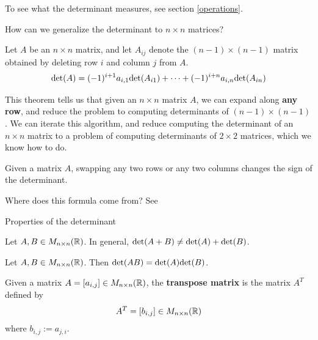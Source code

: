 To see what the determinant measures, see section \ref{operations}.


\begin{motivating}
How can we generalize the determinant to $n \times n$ matrices?
\end{motivating}

\begin{theorem}
    Let $A$ be an $n \times n$ matrix, and let $A_{ij}$ denote the $(n-1) \times (n-1)$ matrix obtained by deleting row $i$ and column $j$ from $A$.
    $$\textnormal{det}(A) = (-1)^{i+1}a_{i,1}\textnormal{det}(A_{i1}) + \cdots +  (-1)^{i+n}a_{i,n}\textnormal{det}(A_{in})$$
    
    \end{theorem}

This theorem tells us that given an $n \times n$ matrix $A$, we can expand along \textbf{any row}, and reduce the problem to computing determinants of $(n-1) \times (n-1)$.  We can iterate this algorithm, and reduce computing the determinant of an $n \times n$ matrix to a problem of computing determinants of $2 \times 2$ matrices, which we know how to do.

\begin{proposition}
    Given a matrix $A$, swapping any two rows or any two columns changes the sign of the determinant.
\end{proposition}




Where does this formula come from? See 




Properties of the determinant
    
    \begin{remark}
    Let $A, B \in M_{n \times n}(\mathbb{R})$. In general, $\textnormal{det}(A+B) \neq \textnormal{det}(A) + \textnormal{det}(B)$.
    \end{remark}
    
    \begin{theorem}

    Let $A, B \in M_{n \times n}(\mathbb{R})$.  Then $\textnormal{det}(AB) = \textnormal{det}(A)\textnormal{det}(B)$.
     
    \end{theorem}
    
    


\begin{definition}
    Given a matrix $A = [a_{i,j}] \in M_{n\times n}(\mathbb{R})$, the \textbf{transpose matrix} is the matrix $A^T$ defined by $$A^T = [b_{i,j}] \in M_{n\times n}(\mathbb{R})$$
    where $b_{i,j} := a_{j,i}$.
\end{definition}

